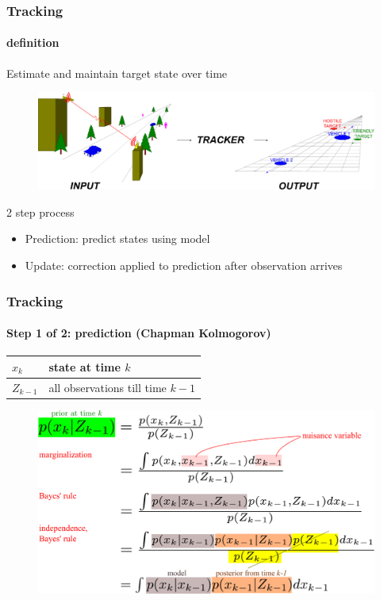 \begin{frame}
\frametitle{Tracking}
\framesubtitle{definition}
\mypagenum{}
Estimate and maintain {\color{red}target state} over {\color{red}time}
\begin{figure}
\includegraphics[width=1.0\textwidth]{figs/TRK_overviewDiagram.pdf}
\end{figure}
\vspace{0.2in}
2 step process
\begin{itemize}
\item Prediction: predict states using model
\item Update: correction applied to prediction after observation arrives
\end{itemize}
\end{frame}


\begin{frame}
\frametitle{Tracking}
\framesubtitle{Step 1 of 2: prediction (Chapman Kolmogorov)}
\mypagenum{}
\begin{table}
\begin{tabular}{|l|l|}\hline
$x_k$ & state at time $k$\\\hline
$Z_{k-1}$ &  all observations till time $k-1$\\\hline
\end{tabular}
\end{table}
\begin{figure}
\includegraphics[width=1.0\textwidth]{figs/TRK_EQN_prediction.pdf}
\end{figure}
\end{frame}


